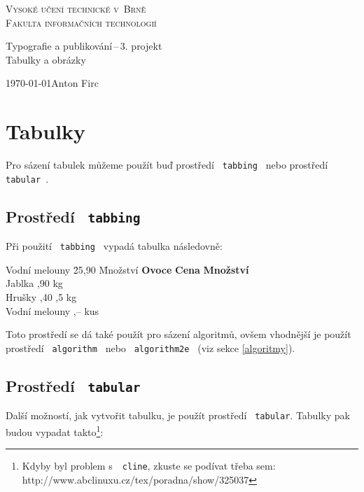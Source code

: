 \documentclass[a4paper, 11pt]{article}
\begin{document}
\begin{titlepage}
	\begin{center}
		\Huge{\textsc{Vysoké učení technické v~Brně\\}}
		\huge{\textsc{Fakulta informačních technologií}}
		
		\Large {Typografie a publikování\,--\,3. projekt\\}
		\Huge{Tabulky a obrázky}
	\end{center}
	{\Large \today \hfill Anton Firc}
\end{titlepage}		

\section{Tabulky}
Pro sázení tabulek můžeme použít buď prostředí \texttt{ tabbing } nebo prostředí\ \texttt{ tabular }.

\subsection{Prostředí \texttt{ tabbing}}

Při použití \texttt{ tabbing } vypadá tabulka následovně:

\begin{tabbing}
	Vodní melouny \quad \= 25,90 \quad \= Množství \kill
	\textbf{Ovoce} \> \textbf{Cena} \> \textbf{Množství} \\
	Jablka ,90  kg \\
	Hrušky ,40 ,5 kg \\
	Vodní melouny ,--  kus
\end{tabbing}

\noindent Toto prostředí se dá také použít pro sázení algoritmů, ovšem vhodnější je použít 
prostředí \texttt{ algorithm } nebo \texttt{ algorithm2e } (viz sekce \ref{algoritmy}).

\subsection{Prostředí \texttt{ tabular}}

Další možností, jak vytvořit tabulku, je použít prostředí \texttt{ tabular}. Tabulky pak 
budou vypadat takto\footnote{Kdyby byl problem s~\texttt{ cline}, zkuste se podívat třeba sem: 
	http://www.abclinuxu.cz/tex/poradna/show/325037}:
\end{document}
